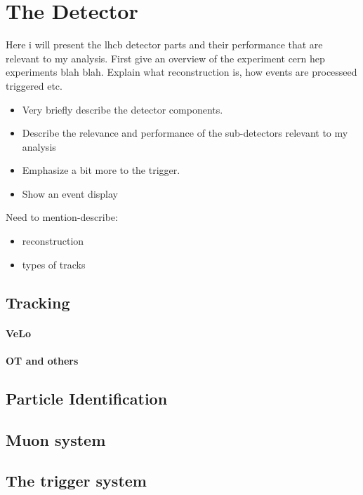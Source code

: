 

\chapter{The \lhcb Detector}
\label{lhcb_detector}

Here i will present the lhcb detector parts and their performance that are relevant to my analysis.
First give an overview of the experiment cern hep experiments blah blah. Explain what reconstruction
is, how events are processeed triggered etc.

\begin{itemize}
  \item Very briefly describe the detector components.
  \item Describe the relevance and performance of the sub-detectors relevant to my analysis
  \item Emphasize a bit more to the trigger.
  \item Show an event display
\end{itemize}

Need to mention-describe:
\begin{itemize}
  \item reconstruction
  \item types of tracks
\end{itemize}



\section{Tracking}
\subsubsection{VeLo}
\subsubsection{OT and others}

\section{Particle Identification}

\section{Muon system}

\section{The trigger system}
\label{lhcb_trigger}

